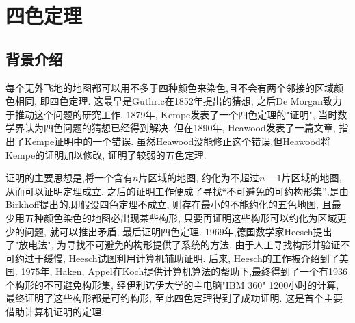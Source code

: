 \documentclass[main]{subfiles}
\begin{document}
\renewcommand{\filename}{subfile11}%
{}

\section{四色定理}
\subsection*{背景介绍}
每个无外飞地的地图都可以用不多于四种颜色来染色,且不会有两个邻接的区域颜色相同, 即四色定理. 这最早是Guthric在1852年提出的猜想, 之后De Morgan致力于推动这个问题的研究工作. 1879年, Kempe发表了一个四色定理的"证明", 当时数学界认为四色问题的猜想已经得到解决. 但在1890年, Heawood发表了一篇文章, 指出了Kempe证明中的一个错误. 虽然Heawood没能修正这个错误,但Heawood将Kempe的证明加以修改, 证明了较弱的五色定理.

证明的主要思想是,将一个含有$n$片区域的地图, 约化为不超过$n-1$片区域的地图, 从而可以证明定理成立.
之后的证明工作便成了寻找``不可避免的可约构形集'',是由Birkhoff提出的,即假设四色定理不成立, 则存在最小的不能约化的五色地图, 且最少用五种颜色染色的地图必出现某些构形, 只要再证明这些构形可以约化为区域更少的问题, 就可以推出矛盾, 最后证明四色定理. 1969年,德国数学家Heesch提出了"放电法",
为寻找不可避免的构形提供了系统的方法. 由于人工寻找构形并验证不可约过于缓慢, Heesch试图利用计算机辅助证明. 后来, Heesch的工作被介绍到了美国. 1975年, Haken, Appel在Koch提供计算机算法的帮助下,最终得到了一个有1936个构形的不可避免构形集, 经伊利诺伊大学的主电脑"IBM 360" 1200小时的计算, 最终证明了这些构形都是可约构形, 至此四色定理得到了成功证明. 这是首个主要借助计算机证明的定理.
\end{document}
